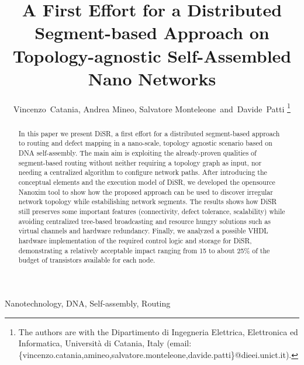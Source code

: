 \documentclass[final,journal,letterpaper]{IEEEtran}
\begin{document}

\title{A First Effort for a Distributed Segment-based Approach on Topology-agnostic
Self-Assembled Nano Networks} 

\author{Vincenzo~Catania, Andrea Mineo, Salvatore Monteleone~and~Davide~Patti%
\thanks{The authors are with the Dipartimento di Ingegneria
Elettrica, Elettronica ed Informatica, Universit\`a di Catania, Italy
(email: \{vincenzo.catania,amineo,salvatore.monteleone,davide.patti\}@dieei.unict.it).}}

\maketitle


\begin{abstract}
In this paper we present DiSR, a first effort for a distributed
segment-based approach to routing and defect mapping in a nano-scale, topology agnostic
scenario based on DNA self-assembly. The main aim is exploiting the
already-proven qualities of segment-based routing without neither requiring a
topology graph as input, nor needing a centralized algorithm to
configure network paths. 
After introducing the conceptual elements and the execution model of
DiSR, we developed the opensource Nanoxim tool to show how the proposed
approach can be used to discover irregular network topology while
estabilishing network segments.  The results shows how DiSR still
preserves some important features
(connectivity, defect tolerance, scalability)  while avoiding centralized
tree-based broadcasting and resource hungry solutions such as virtual
channels and hardware redundancy. Finally, we analyzed a possible
VHDL hardware implementation of the required control logic and storage for
DiSR, demonstrating a relatively acceptable impact ranging from 15 to
about 25\% of the budget of transistors available for each node.
\end{abstract}


\begin{IEEEkeywords}
Nanotechnology, DNA, Self-assembly, Routing
\end{IEEEkeywords}
\end{document}

